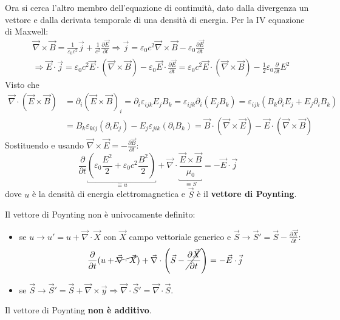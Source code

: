 \documentclass[a4paper]{scrartcl}
\numberwithin{equation}{subsection}
\theoremstyle{style1}
\begin{document}
Ora si cerca l'altro membro dell'equazione di continuit\`a, dato dalla divergenza un vettore e dalla derivata temporale di una densit\`a di energia. Per la IV equazione di Maxwell:
\[
\begin{split}
	&\vec{\nabla }\times \vec{B}= \frac{1}{\varepsilon _0c^2}\vec{j}+\frac{1}{c^2} \frac{\partial \vec{E}}{\partial t} \Rightarrow \vec{j} = \varepsilon _0 c^2 \vec{\nabla }\times \vec{B}-\varepsilon _0 \frac{\partial \vec{E}}{\partial t} \\
	&\Rightarrow \vec{E}\cdot \vec{j}= \varepsilon _0 c^2 \vec{E}\cdot (\vec{\nabla }\times \vec{B}) - \varepsilon _0 \vec{E}\cdot \frac{\partial \vec{E}}{\partial t} = \varepsilon _0 c^2 \vec{E}\cdot (\vec{\nabla }\times \vec{B}) - \frac{1}{2}\varepsilon _0 \frac{\partial }{\partial t} E^2 
\end{split}
\] 
Visto che
\[
	\begin{split}
		\vec{\nabla }\cdot (\vec{E}\times \vec{B}) &= \partial _i (\vec{E}\times \vec{B})_i = \partial _i \varepsilon _{ijk} E_jB_k = \varepsilon _{ijk} \partial _i(E_jB_k)= \varepsilon _{ijk} (B_k \partial _i E_j + E_j \partial _i B_k)\\
							   &= B_k \varepsilon _{kij} (\partial _iE_j) - E_j \varepsilon _{jik} (\partial _iB_k) = \vec{B}\cdot (\vec{\nabla }\times \vec{E}) - \vec{E}\cdot (\vec{\nabla }\times \vec{B})
	\end{split}
\] 
Sostituendo e usando $\vec{\nabla }\times \vec{E}=- \frac{\partial \vec{B}}{\partial t} $:
\begin{equation}
	\frac{\partial }{\partial t} \underbracket{\left(\varepsilon _0 \frac{E^2}{2}+ \varepsilon _0 c^2 \frac{B^2}{2}\right)}_{\equiv u}  +\vec{\nabla }\cdot \underbracket{\frac{\vec{E}\times \vec{B}}{\mu_0}}_{\equiv S} = - \vec{E}\cdot \vec{j}
\end{equation}
dove $u$ \`e la densit\`a di energia elettromagnetica e $\vec{S}$ \`e il \textbf{vettore di Poynting}. 

Il vettore di Poynting non \`e univocamente definito:
\begin{itemize}
	\item se $u\to u' = u +\vec{\nabla }\cdot \vec{X}$ con $\vec{X}$ campo vettoriale generico e $\vec{S}\to \vec{S}' = \vec{S} - \frac{\partial \vec{X}}{\partial t} $:
		\[
			\frac{\partial }{\partial t} (u+ \cancel{\vec{\nabla }\cdot \vec{X}}) + \vec{\nabla }\cdot \left(\vec{S}-\cancel{\frac{\partial \vec{X}}{\partial t} } \right) = -\vec{E}\cdot \vec{j}
		\] 
	\item se $\vec{S}\to \vec{S}' = \vec{S}+ \vec{\nabla }\times \vec{y}\Rightarrow \vec{\nabla }\cdot \vec{S}' = \vec{\nabla }\cdot \vec{S}$.
\end{itemize}
Il vettore di Poynting \textbf{non \`e additivo}.
\end{document}
